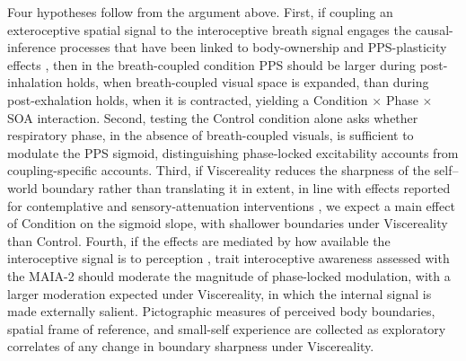Four hypotheses follow from the argument above. First, if coupling an exteroceptive spatial signal to the interoceptive breath signal engages the causal-inference processes that have been linked to body-ownership and PPS-plasticity effects \citep{samad_2015, chancel_2021, Ardizzi2018}, then in the breath-coupled condition PPS should be larger during post-inhalation holds, when breath-coupled visual space is expanded, than during post-exhalation holds, when it is contracted, yielding a Condition $\times$ Phase $\times$ SOA interaction. Second, testing the Control condition alone asks whether respiratory phase, in the absence of breath-coupled visuals, is sufficient to modulate the PPS sigmoid, distinguishing phase-locked excitability accounts \citep{saltafossi_2025, kluger_2021, grund_2021} from coupling-specific accounts. Third, if Viscereality reduces the sharpness of the self--world boundary rather than translating it in extent, in line with effects reported for contemplative and sensory-attenuation interventions \citep{Chiarella2024, hanley_2020, hruby_2024, nguyen_2020}, we expect a main effect of Condition on the sigmoid slope, with shallower boundaries under Viscereality than Control. Fourth, if the effects are mediated by how available the interoceptive signal is to perception \citep{Ardizzi2018, salvato_2020, bogdanova_2021, Goral2024}, trait interoceptive awareness assessed with the MAIA-2 should moderate the magnitude of phase-locked modulation, with a larger moderation expected under Viscereality, in which the internal signal is made externally salient. Pictographic measures of perceived body boundaries, spatial frame of reference, and small-self experience are collected as exploratory correlates of any change in boundary sharpness under Viscereality.
